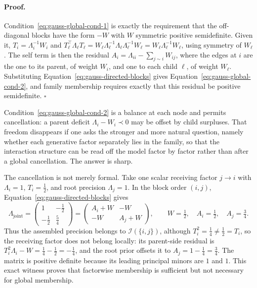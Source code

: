 \paragraph{Proof.}
Condition~\eqref{eq:gauss-global-cond-1} is exactly the requirement that the off-diagonal blocks have the form $-W$ with $W$ symmetric positive semidefinite. Given it, $T_i=\Lambda_i^{-1}W_i$ and $T_\ell^\top\Lambda_\ell T_\ell=W_\ell\Lambda_\ell^{-1}\Lambda_\ell\Lambda_\ell^{-1}W_\ell=W_\ell\Lambda_\ell^{-1}W_\ell$, using symmetry of $W_\ell$. The self term is then the residual $A_i=\Lambda_{ii}-\sum_{j\sim i}W_{ij}$, where the edges at $i$ are the one to its parent, of weight $W_i$, and one to each child $\ell$, of weight $W_\ell$. Substituting Equation~\eqref{eq:gauss-directed-blocks} gives Equation~\eqref{eq:gauss-global-cond-2}, and family membership requires exactly that this residual be positive semidefinite. $\square$

Condition~\eqref{eq:gauss-global-cond-2} is a balance at each node and permits cancellation: a parent deficit $\Lambda_i-W_i\prec0$ may be offset by child surpluses. That freedom disappears if one asks the stronger and more natural question, namely whether each generative factor separately lies in the family, so that the interaction structure can be read off the model factor by factor rather than after a global cancellation. The answer is sharp.

The cancellation is not merely formal. Take one scalar receiving factor \(j\to i\) with
\(\Lambda_i=1\), \(T_i=\tfrac12\), and root precision \(\Lambda_j=1\). In the block order \((i,j)\), Equation~\eqref{eq:gauss-directed-blocks} gives
\begin{equation}
\Lambda_{\mathrm{joint}}
=
\begin{pmatrix}
1&-\tfrac12\\[2pt]
-\tfrac12&\tfrac54
\end{pmatrix}
=
\begin{pmatrix}
A_i+W&-W\\[2pt]
-W&A_j+W
\end{pmatrix},
\qquad
W=\tfrac12,\quad A_i=\tfrac12,\quad A_j=\tfrac34 .
\label{eq:gauss-global-cancellation-witness}
\end{equation}
Thus the assembled precision belongs to \(\mathcal I(\{i,j\})\), although
\(T_i^2=\tfrac14\neq\tfrac12=T_i\), so the receiving factor does not belong locally: its parent-side residual is \(T_i^2\Lambda_i-W=\tfrac14-\tfrac12=-\tfrac14\), and the root prior offsets it to \(A_j=1-\tfrac14=\tfrac34\). The matrix is positive definite because its leading principal minors are \(1\) and \(1\). This exact witness proves that factorwise membership is sufficient but not necessary for global membership. 

